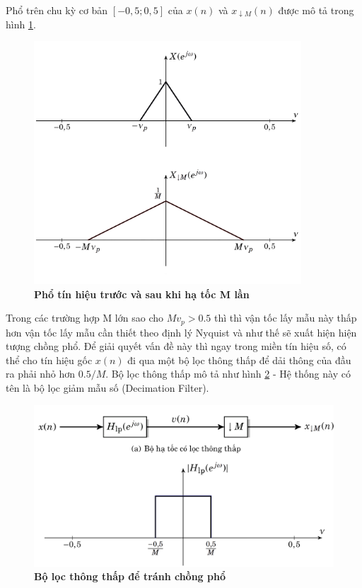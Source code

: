 Phổ trên chu kỳ cơ bản $[-0,5;0,5]$ của $x(n)$ và $x_{\downarrow M}(n)$ được mô tả trong hình \ref{pho_truoc_sau_down}.

\begin{figure}[H]
    \centering
    \includegraphics[width=10cm]{Images/Chuong2/pho_truoc_sau_down.png}
    \caption[Phổ tín hiệu trước và sau khi hạ tốc M lần]{\bfseries \fontsize{12pt}{0pt}\selectfont Phổ tín hiệu trước và sau khi hạ tốc M lần}
    \label{pho_truoc_sau_down}
\end{figure}

Trong các trường hợp M lớn sao cho $Mv_p > 0.5$ thì thì vận tốc lấy mẫu này thấp hơn vận tốc lấy mẫu cần thiết theo định lý Nyquist và như thế sẽ xuất hiện hiện tượng chồng phổ. Để giải quyết vấn đề này thì ngay trong miền tín hiệu số, có thể cho tín hiệu gốc $x(n)$ đi qua một bộ lọc thông thấp để dải thông của đầu ra phải nhỏ hơn $0.5/M$. Bộ lọc thông thấp mô tả như hình \ref{filter_downsample} - Hệ thống này có tên là bộ lọc giảm mẫu số (Decimation Filter).

\begin{figure}[ht!]
    \centering
    \includegraphics[width=12cm]{Images/Chuong2/filter_downsample.png}
    \caption[Bộ lọc thông thấp để tránh chồng phổ]{\bfseries \fontsize{12pt}{0pt}\selectfont Bộ lọc thông thấp để tránh chồng phổ}
    \label{filter_downsample}
\end{figure}

